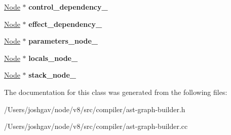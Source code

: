 \begin{DoxyCompactItemize}
\item 
\hyperlink{classv8_1_1internal_1_1compiler_1_1_node}{Node} $\ast$ {\bfseries control\+\_\+dependency\+\_\+}\hypertarget{classv8_1_1internal_1_1compiler_1_1_ast_graph_builder_1_1_environment_a756a50ce022e3a6b9c909365c734f9ba}{}\label{classv8_1_1internal_1_1compiler_1_1_ast_graph_builder_1_1_environment_a756a50ce022e3a6b9c909365c734f9ba}

\item 
\hyperlink{classv8_1_1internal_1_1compiler_1_1_node}{Node} $\ast$ {\bfseries effect\+\_\+dependency\+\_\+}\hypertarget{classv8_1_1internal_1_1compiler_1_1_ast_graph_builder_1_1_environment_aab04f0f9fe12a409c9f3399647c0bb16}{}\label{classv8_1_1internal_1_1compiler_1_1_ast_graph_builder_1_1_environment_aab04f0f9fe12a409c9f3399647c0bb16}

\item 
\hyperlink{classv8_1_1internal_1_1compiler_1_1_node}{Node} $\ast$ {\bfseries parameters\+\_\+node\+\_\+}\hypertarget{classv8_1_1internal_1_1compiler_1_1_ast_graph_builder_1_1_environment_a75f6953a6eaa879283237375dfbaaf86}{}\label{classv8_1_1internal_1_1compiler_1_1_ast_graph_builder_1_1_environment_a75f6953a6eaa879283237375dfbaaf86}

\item 
\hyperlink{classv8_1_1internal_1_1compiler_1_1_node}{Node} $\ast$ {\bfseries locals\+\_\+node\+\_\+}\hypertarget{classv8_1_1internal_1_1compiler_1_1_ast_graph_builder_1_1_environment_a816e99ea9fb4aa23fd3fbf4337c25302}{}\label{classv8_1_1internal_1_1compiler_1_1_ast_graph_builder_1_1_environment_a816e99ea9fb4aa23fd3fbf4337c25302}

\item 
\hyperlink{classv8_1_1internal_1_1compiler_1_1_node}{Node} $\ast$ {\bfseries stack\+\_\+node\+\_\+}\hypertarget{classv8_1_1internal_1_1compiler_1_1_ast_graph_builder_1_1_environment_a88fa7121ae340e70e543feefbdad0923}{}\label{classv8_1_1internal_1_1compiler_1_1_ast_graph_builder_1_1_environment_a88fa7121ae340e70e543feefbdad0923}

\end{DoxyCompactItemize}


The documentation for this class was generated from the following files\+:\begin{DoxyCompactItemize}
\item 
/\+Users/joshgav/node/v8/src/compiler/ast-\/graph-\/builder.\+h\item 
/\+Users/joshgav/node/v8/src/compiler/ast-\/graph-\/builder.\+cc\end{DoxyCompactItemize}
